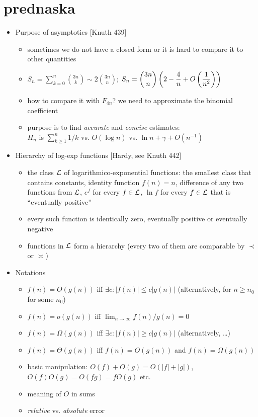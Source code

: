 \documentclass[10pt, a4paper]{article}
\begin{document}
\section{prednaska}


\begin{itemize}
\item
Purpose of asymptotics [Knuth 439]
\begin{itemize}
    \item sometimes we do not have a closed form or it is hard to compare it to other quantities
    \item $\displaystyle S_n = \sum_{k=0}^n {3n\choose k}\sim 2{3n\choose n}$; $\displaystyle S_n = {3n\choose n}\left(2-{4\over n} + O\left({1\over n^2}\right)\right)$
    \item how to compare it with $F_{4n}$? we need to approximate the binomial coefficient
    \item purpose is to find \emph{accurate} and \emph{concise} estimates:\\
            $H_n$ is $\sum_{k\ge 1}^n 1/k$ vs. $O(\log n)$ vs. $\ln n + \gamma + O(n^{-1})$ 
\end{itemize}

\item
Hierarchy of log-exp functions [Hardy, see Knuth 442]
\begin{itemize}
    \item the class $\cal L$ of logarithmico-exponential functions:
            the smallest class that contains constants, identity function $f(n) = n$,
            difference of any two functions from $\cal L$,
            $e^f$ for every $f\in {\cal L}$, $\ln f$ for every $f\in {\cal L}$ that is ``eventually positive''
    \item every such function is identically zero, eventually positive or eventually negative
    \item functions in $\cal L$ form a hierarchy (every two of them are comparable by $\prec$ or $\asymp$)
\end{itemize}

\item
Notations
\begin{itemize}
    \item $f(n) = O(g(n))$ iff $\exists c: |f(n)|\le c|g(n)|$ (alternatively, for $n\ge n_0$ for some $n_0$)
    \item $f(n) = o(g(n))$ iff $\lim_{n\to\infty} f(n)/g(n) = 0$
    \item $f(n) = \Omega(g(n))$ iff $\exists c: |f(n)|\ge c|g(n)|$ (alternatively, \dots)
    \item $f(n) = \Theta(g(n))$ iff $f(n) = O(g(n))$ and $f(n) = \Omega(g(n))$
    \item basic manipulation: $O(f)+O(g) = O(|f|+|g|)$, $O(f)O(g)=O(fg)=fO(g)$ etc.
    \item meaning of $O$ in sums
    \item \emph{relative} vs. \emph{absolute} error
\end{itemize}


\end{itemize}
\end{document}

